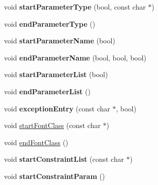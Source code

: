 \begin{DoxyCompactItemize}
\item 
\hypertarget{class_man_generator_a16e366b8ae01f3d7dea6bef22426a623}{void {\bfseries start\-Parameter\-Type} (bool, const char $\ast$)}\label{class_man_generator_a16e366b8ae01f3d7dea6bef22426a623}

\item 
\hypertarget{class_man_generator_a1e61ed71851d9423940748df3342715b}{void {\bfseries end\-Parameter\-Type} ()}\label{class_man_generator_a1e61ed71851d9423940748df3342715b}

\item 
\hypertarget{class_man_generator_aaa80b6d46b0b3f69f5604a6394aad2de}{void {\bfseries start\-Parameter\-Name} (bool)}\label{class_man_generator_aaa80b6d46b0b3f69f5604a6394aad2de}

\item 
\hypertarget{class_man_generator_a2eb32de99cf4ffa66d38b4d1dc304ad4}{void {\bfseries end\-Parameter\-Name} (bool, bool, bool)}\label{class_man_generator_a2eb32de99cf4ffa66d38b4d1dc304ad4}

\item 
\hypertarget{class_man_generator_a61b1ab9b798f5af0ec297a1b70b943eb}{void {\bfseries start\-Parameter\-List} (bool)}\label{class_man_generator_a61b1ab9b798f5af0ec297a1b70b943eb}

\item 
\hypertarget{class_man_generator_a18eb29acbeb3f72b0d8f4ea23b21f054}{void {\bfseries end\-Parameter\-List} ()}\label{class_man_generator_a18eb29acbeb3f72b0d8f4ea23b21f054}

\item 
\hypertarget{class_man_generator_afe0983cd10a7702e0bf3c3596b9f7b87}{void {\bfseries exception\-Entry} (const char $\ast$, bool)}\label{class_man_generator_afe0983cd10a7702e0bf3c3596b9f7b87}

\item 
void \hyperlink{class_man_generator_ad907f4c47cf56f8aac603de5537963f0}{start\-Font\-Class} (const char $\ast$)
\item 
void \hyperlink{class_man_generator_ab7851025d80a6d1ed6dd8e25016136e1}{end\-Font\-Class} ()
\item 
\hypertarget{class_man_generator_afe53ac5dd11e37006dd610540fc634a2}{void {\bfseries start\-Constraint\-List} (const char $\ast$)}\label{class_man_generator_afe53ac5dd11e37006dd610540fc634a2}

\item 
\hypertarget{class_man_generator_afd7a8f4d6caba86120db8bff0fa37422}{void {\bfseries start\-Constraint\-Param} ()}\label{class_man_generator_afd7a8f4d6caba86120db8bff0fa37422}


\end{DoxyCompactItemize}
